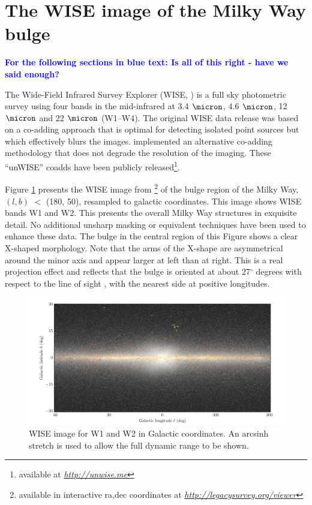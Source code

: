 \documentclass[12pt, preprint]{aastex}
\newcommand{\niceurl}[1]{\href{#1}{\textsl{#1}}}
\newcommand{\viewerurl}{\niceurl{http://legacysurvey.org/viewer}}
\begin{document}
\section{The WISE image of the Milky Way bulge}

\textcolor{blue}{\textbf{For the following sections in blue text: Is all of this right - have we said enough?} }

The Wide-Field Infrared Survey Explorer (WISE, \citet{W2010}) is a full sky photometric survey using four bands in the mid-infrared at 3.4 $\micron$, 4.6 $\micron$, 12 $\micron$ and 22 $\micron$ (W1--W4).
The original WISE data release was based on a co-adding approach that is optimal for detecting isolated point sources but which effectively blurs the images. \citet{Lang2014b} implemented an alternative co-adding methodology that does not degrade the resolution of the imaging.  These ``unWISE'' coadds have been publicly released\footnote{available at \niceurl{http://unwise.me}}.


Figure \ref{fig:xbulge} presents the WISE image from \citet{Lang2014a} \footnote{available in interactive ra,dec coordinates at \viewerurl} of the bulge region of the Milky Way, $(l,b)$ $<$ (180, 50), resampled to galactic coordinates.  This image shows WISE bands W1 and W2. This presents the overall Milky Way structures in exquisite detail.
No additional unsharp masking or equivalent techniques have been used to enhance these data. The bulge in the central region of this Figure shows a clear X-shaped morphology. Note that the arms of the X-shape are asymmetrical around the minor axis and appear larger at left than at right. This is a real projection effect and reflects that the bulge is oriented at about 27$^\circ$ degrees with respect to the line of sight \citep{Wegg2013}, with the nearest side at positive longitudes.


\begin{figure}[h!]
\centering
        \includegraphics[width=\textwidth]{xbulge-00}
\caption{WISE image for W1 and W2 in Galactic coordinates.  An arcsinh
  stretch is used to allow the full dynamic range to be shown.}
\label{fig:xbulge}
\end{figure}
\end{document}
